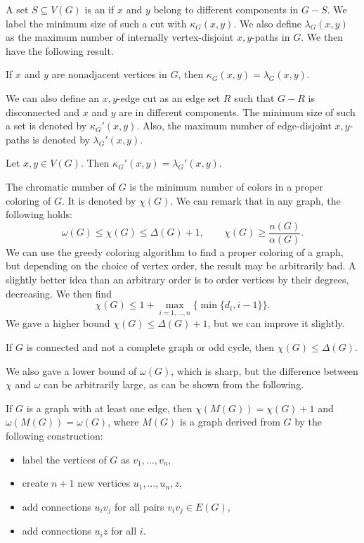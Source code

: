 A set $S \subseteq V(G)$ is an  if $x$ and $y$ belong to
different components in $G - S$.
We label the minimum size of such a cut with $\kappa_G(x,y)$.
We also define $\lambda_G(x,y)$ as the maximum number of internally
vertex-disjoint $x,y$-paths in $G$.
We then have the following result.

\begin{theorem}
  If $x$ and $y$ are nonadjacent vertices in $G$, then $\kappa_G(x,y) =
  \lambda_G(x,y)$.
\end{theorem}

We can also define an $x,y$-edge cut as an edge set $R$ such that $G - R$ is
disconnected and $x$ and $y$ are in different components.
The minimum size of such a set is denoted by $\kappa_G'(x,y)$.
Also, the maximum number of edge-disjoint $x,y$-paths is denoted by
$\lambda_G'(x,y)$.

\begin{theorem}
  Let $x,y \in V(G)$.
  Then $\kappa_G'(x,y) = \lambda_G'(x,y)$.
\end{theorem}


The chromatic number of $G$ is the minimum number of colors in a proper coloring
of $G$.
It is denoted by $\chi(G)$.
We can remark that in any graph, the following holds:
\[
  \omega(G) \le \chi(G) \le \Delta(G) + 1,
  \qquad
  \chi(G) \ge \frac{n(G)}{\alpha(G)}.
\]
We can use the greedy coloring algorithm to find a proper coloring of a graph,
but depending on the choice of vertex order, the result may be arbitrarily bad.
A slightly better idea than an arbitrary order is to order vertices by their
degrees, decreasing.
We then find
\[
  \chi(G) \le 1 + \max_{i=1, \ldots, n} \{ \min \{ d_i, i-1 \} \}.
\]
We gave a higher bound $\chi(G) \le \Delta(G) + 1$, but we can improve it
slightly.

\begin{theorem}[Brooks]
  If $G$ is connected and not a complete graph or odd cycle, then $\chi(G) \le
  \Delta(G)$.
\end{theorem}

We also gave a lower bound of $\omega(G)$, which is sharp, but the difference
between $\chi$ and $\omega$ can be arbitrarily large, as can be shown from the
following.

\begin{theorem}
  If $G$ is a graph with at least one edge, then $\chi(M(G)) = \chi(G) + 1$ and
  $\omega(M(G)) = \omega(G)$, where $M(G)$ is a graph derived from $G$ by the
  following construction:
  \begin{itemize}
  \item label the vertices of $G$ as $v_1, \ldots, v_n$,
  \item create $n+1$ new vertices $u_1, \ldots, u_n, z$,
  \item add connections $u_i v_j$ for all pairs $v_i v_j \in E(G)$,
  \item add connections $u_i z$ for all $i$.
  \end{itemize}
\end{theorem}

